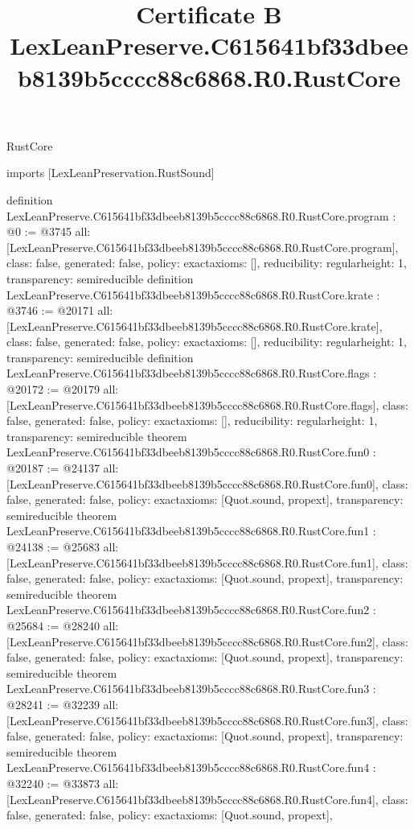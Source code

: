 \begin{lexlean}{RustCore}
\title{Certificate B LexLeanPreserve.C615641bf33dbeeb8139b5cccc88c6868.R0.RustCore}
\begin{coremodule}
imports [LexLeanPreservation.RustSound]

definition LexLeanPreserve.C615641bf33dbeeb8139b5cccc88c6868.R0.RustCore.program : @0 := @3745 {
  all: [LexLeanPreserve.C615641bf33dbeeb8139b5cccc88c6868.R0.RustCore.program],
  class: false,
  generated: false,
  policy: exact{axioms: []},
  reducibility: regular{height: 1},
  transparency: semireducible
}
definition LexLeanPreserve.C615641bf33dbeeb8139b5cccc88c6868.R0.RustCore.krate : @3746 := @20171 {
  all: [LexLeanPreserve.C615641bf33dbeeb8139b5cccc88c6868.R0.RustCore.krate],
  class: false,
  generated: false,
  policy: exact{axioms: []},
  reducibility: regular{height: 1},
  transparency: semireducible
}
definition LexLeanPreserve.C615641bf33dbeeb8139b5cccc88c6868.R0.RustCore.flags : @20172 := @20179 {
  all: [LexLeanPreserve.C615641bf33dbeeb8139b5cccc88c6868.R0.RustCore.flags],
  class: false,
  generated: false,
  policy: exact{axioms: []},
  reducibility: regular{height: 1},
  transparency: semireducible
}
theorem LexLeanPreserve.C615641bf33dbeeb8139b5cccc88c6868.R0.RustCore.fun0 : @20187 := @24137 {
  all: [LexLeanPreserve.C615641bf33dbeeb8139b5cccc88c6868.R0.RustCore.fun0],
  class: false,
  generated: false,
  policy: exact{axioms: [Quot.sound, propext]},
  transparency: semireducible
}
theorem LexLeanPreserve.C615641bf33dbeeb8139b5cccc88c6868.R0.RustCore.fun1 : @24138 := @25683 {
  all: [LexLeanPreserve.C615641bf33dbeeb8139b5cccc88c6868.R0.RustCore.fun1],
  class: false,
  generated: false,
  policy: exact{axioms: [Quot.sound, propext]},
  transparency: semireducible
}
theorem LexLeanPreserve.C615641bf33dbeeb8139b5cccc88c6868.R0.RustCore.fun2 : @25684 := @28240 {
  all: [LexLeanPreserve.C615641bf33dbeeb8139b5cccc88c6868.R0.RustCore.fun2],
  class: false,
  generated: false,
  policy: exact{axioms: [Quot.sound, propext]},
  transparency: semireducible
}
theorem LexLeanPreserve.C615641bf33dbeeb8139b5cccc88c6868.R0.RustCore.fun3 : @28241 := @32239 {
  all: [LexLeanPreserve.C615641bf33dbeeb8139b5cccc88c6868.R0.RustCore.fun3],
  class: false,
  generated: false,
  policy: exact{axioms: [Quot.sound, propext]},
  transparency: semireducible
}
theorem LexLeanPreserve.C615641bf33dbeeb8139b5cccc88c6868.R0.RustCore.fun4 : @32240 := @33873 {
  all: [LexLeanPreserve.C615641bf33dbeeb8139b5cccc88c6868.R0.RustCore.fun4],
  class: false,
  generated: false,
  policy: exact{axioms: [Quot.sound, propext]},
}
\end{coremodule}
\end{lexlean}

